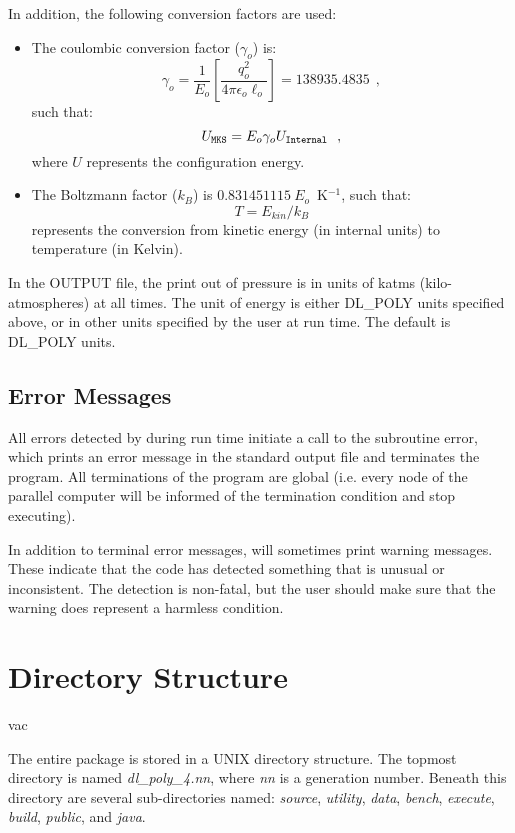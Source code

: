\noindent In addition, the following conversion factors are used:

\begin{itemize}
\item The coulombic conversion
factor ($\gamma_{o}$) is:
\[ \gamma_{o} = \frac{1}{E_{o}} \left[ \frac{q_{o}^{2}}{4 \pi \epsilon_{o} \ell_{o}} \right] = 138935.4835~~, \]
such that:
\[U_{\tt MKS}=E_{o}\gamma_{o}U_{\tt Internal}~~,\]
where $U$ represents the configuration energy.
\item The Boltzmann factor ($k_{B}$) is $0.831451115~E_{o}$~K$^{-1}$,
such that:
\[T=E_{kin}/k_{B}\]
represents the conversion from kinetic energy (in internal units)
to temperature (in Kelvin).
\end{itemize}

 In the \D OUTPUT file, the print out of
pressure is in units of katms
(kilo-atmospheres) at all times.  The unit of energy is either
DL\_POLY units specified above, or in other units specified by the
user at run time.  The default is DL\_POLY units.

\subsection{Error Messages}

All errors detected by \D during run time initiate a call to the
subroutine {\sc error}, which prints an error message in the
standard output file and terminates the program.  All terminations
of the program are global (i.e. every node of the parallel
computer will be informed of the termination condition and stop
executing).

In addition to terminal error messages, \D will sometimes print
warning messages.  These indicate that the code has detected
something that is unusual or inconsistent.  The detection is
non-fatal, but the user should make sure that the warning does
represent a harmless condition.

\section{Directory Structure}
\label{directory-structure}vac

The entire \D package is stored in a UNIX directory structure. The
topmost directory is named {\em dl\_poly\_4.nn}, where {\em nn} is
a generation number.  Beneath this directory are several
sub-directories named: {\em source},
{\em utility},
{\em data},
{\em bench},
{\em execute},
{\em build},
{\em public}, and
{\em java}.

